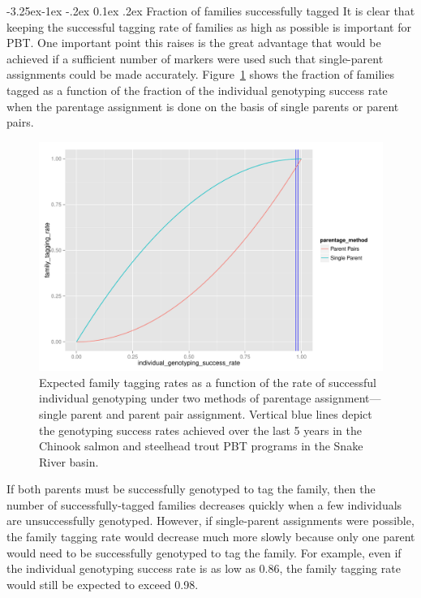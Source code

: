 \documentclass[11pt]{article}
\makeatletter
\renewcommand\subsection{\@startsection{subsection}{2}{\z@}%
                                     {-3.25ex\@plus -1ex \@minus -.2ex}%
                                     {0.1ex \@plus .2ex}%
                                     {\normalfont\normalsize\bfseries}}
\makeatother
\begin{document}
\subsection{Fraction of families successfully tagged}
It is clear that keeping the successful tagging rate of families as high as possible is important for PBT.  One important
point this raises is the great advantage that would be achieved if a sufficient number of markers were used such that single-parent assignments could be made accurately.  Figure~\ref{fig:succ_rate} shows the fraction of families tagged as a 
function of the fraction of the individual genotyping success rate when the parentage assignment
is done on the basis of single parents or parent pairs. 
\begin{figure}
\centering
\includegraphics[width = \textwidth]{images/succ_rate.pdf}
\caption{Expected family tagging rates as a function of the rate of successful individual genotyping
under two methods of parentage assignment---single parent and parent pair assignment.  Vertical blue lines
depict the genotyping success rates achieved over the last 5 years in the Chinook salmon and steelhead
trout PBT programs in the Snake River basin.}
\label{fig:succ_rate}
\end{figure}

If both parents must be successfully genotyped to tag the family, then the number of successfully-tagged
families decreases quickly when a few individuals are unsuccessfully genotyped.
However, if single-parent assignments were possible, the family tagging rate would
decrease much more slowly because only one parent would need to be successfully
genotyped to tag the family. For example, even if the individual genotyping
success rate is as low as 0.86, the family tagging rate would still be expected to exceed 0.98.
\end{document}
